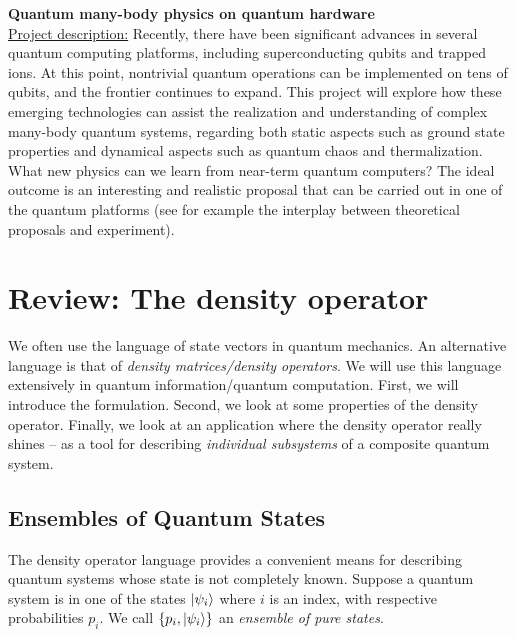 \documentclass{book}
\theoremstyle{definition}
\begin{document}
\textbf{Quantum many-body physics on quantum hardware}\\


\underline{Project description:} Recently, there have been significant advances in several quantum computing platforms, including superconducting qubits and trapped ions. At this point, nontrivial quantum operations can be implemented
on tens of qubits, and the frontier continues to expand. This project will explore how these emerging
technologies can assist the realization and understanding of complex many-body quantum systems,
regarding both static aspects such as ground state properties and dynamical aspects such as quantum chaos
and thermalization. What new physics can we learn from near-term quantum computers? The ideal
outcome is an interesting and realistic proposal that can be carried out in one of the quantum platforms (see
for example the interplay between theoretical proposals and experiment).














\newpage


\section{Review: The density operator}


We often use the language of state vectors in quantum mechanics. An alternative language is that of \textit{density matrices/density operators}. We will use this language extensively in quantum information/quantum computation. First, we will introduce the formulation. Second, we look at some properties of the density operator. Finally, we look at an application where the density operator really shines -- as a tool for describing \textit{individual subsystems} of a composite quantum system.  


\subsection{Ensembles of Quantum States}

The density operator language provides a convenient means for describing quantum systems whose state is not completely known. Suppose a quantum system is in one of the states $\ket{\psi_i}$ where $i$ is an index, with respective probabilities $p_i$. We call $\{p_i, \ket{\psi_i}\}$ an \textit{ensemble of pure states}. \\
\end{document}
